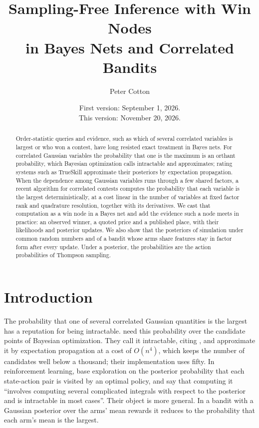 \documentclass[11pt]{article}
\title{\textbf{Sampling-Free Inference with Win Nodes\\ in Bayes Nets and Correlated Bandits}}
\author{Peter Cotton}
\date{\normalsize First version: September 1, 2026.\\ This version:
November 20, 2026.}
\begin{document}
\maketitle

\begin{abstract}
\noindent Order-statistic queries and evidence, such as which of several
correlated variables is largest or who won a contest, have long
resisted exact treatment in Bayes nets. For correlated Gaussian
variables the probability that one is the maximum is an orthant
probability, which Bayesian optimization calls intractable and
approximates; rating systems such as TrueSkill
approximate their posteriors by expectation propagation. When the
dependence among Gaussian variables runs through a few shared
factors, a recent algorithm for correlated contests computes the
probability that each variable is the largest deterministically, at
a cost linear in the number of variables at fixed factor rank and
quadrature resolution, together with its derivatives. We cast that
computation as a win node in a Bayes net and add the evidence such a
node meets in practice: an observed winner, a quoted price and a
published place, with their likelihoods and posterior updates. We also show that the posteriors
of simulation under common random numbers and of a bandit whose arms
share features stay in factor form after every update. Under a
posterior, the probabilities are the action probabilities of Thompson
sampling.
\end{abstract}

\section{Introduction}
\label{sec:queries}

The probability that one of several correlated Gaussian quantities is
the largest has a reputation for being intractable.
\citet{hennig2012} need this probability over the candidate points of
Bayesian optimization. They call it intractable, citing
\citet{plackett1954}, and approximate it by expectation propagation
at a cost of $O(n^4)$, which keeps the number of candidates well
below a thousand; their implementation uses fifty. In reinforcement
learning, \citet{tarbouriech2023} base exploration on the posterior
probability that each state-action pair is visited by an optimal
policy, and say that computing it ``involves computing several
complicated integrals with respect to the posterior and is
intractable in most cases''. Their object is more general. In a
bandit with a Gaussian posterior over the arms' mean rewards it
reduces to the probability that each arm's mean is the largest.
\end{document}
